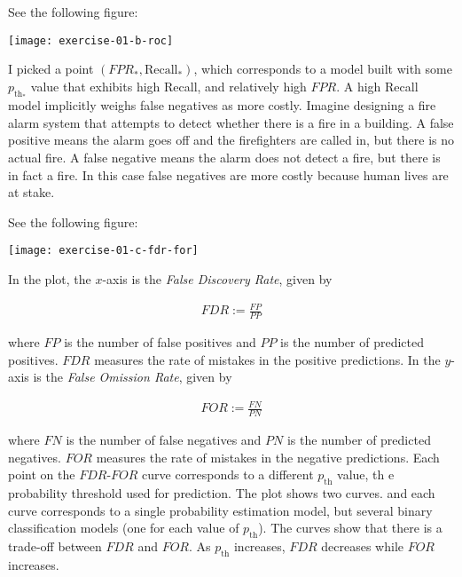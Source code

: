 \documentclass[12pt]{article}
\begin{document}
\begin{enumerate}
See the following figure:

\begin{center}
	\texttt{[image: exercise-01-b-roc]}
\end{center}

I picked a point $(FPR_*, \text{Recall}_*)$, which corresponds to a model
built with some $p_{\text{th}_*}$ value that exhibits high Recall,
and relatively high $FPR$. A high Recall model implicitly weighs false
negatives as more costly. Imagine designing a fire alarm system that
attempts to detect whether there is a fire in a building. A false positive
means the alarm goes off and the firefighters are called in, but there
is no actual fire. A false negative means the alarm does not detect
a fire, but there is in fact a fire. In this case false negatives
are more costly because human lives are at stake.


See the following figure:

\begin{center}
	\texttt{[image: exercise-01-c-fdr-for]}
\end{center}

In the plot, the $x$-axis is the \textit{False Discovery Rate}, given by

\begin{align*}
	FDR := \frac{FP}{PP}
\end{align*}

where $FP$ is the number of false positives and $PP$ is the number of predicted
positives. $FDR$ measures the rate of mistakes in the positive predictions.
In the $y$-axis is the \textit{False Omission Rate}, given by

\begin{align*}
	FOR := \frac{FN}{PN}
\end{align*}

where $FN$ is the number of false negatives and $PN$ is the number of predicted
negatives.  $FOR$ measures the rate of mistakes in the negative predictions.
Each point on the $FDR$-$FOR$ curve corresponds to a different $p_{\text{th}}$
value, th e probability threshold used for prediction. The plot shows two curves.
and each curve corresponds to a single probability estimation model, but several binary
classification models (one for each value of $p_{\text{th}}$). The curves
show that there is a trade-off between $FDR$ and $FOR$. As $p_{\text{th}}$
increases, $FDR$ decreases while $FOR$ increases.


\end{enumerate}
\end{document}
